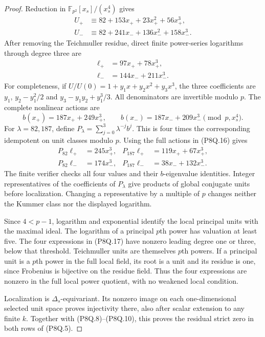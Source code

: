 \begin{proof}
Reduction in $\mathbb F_{p^2}[x_s]/(x_s^4)$ gives
\[
 \begin{aligned}
 U_+&\equiv82+153x_++23x_+^2+56x_+^3,\\
 U_-&\equiv82+241x_-+136x_-^2+158x_-^3 .
 \end{aligned}
 \tag{P8Q.14}
\]
After removing the Teichmuller residue, direct finite
power-series logarithms through degree three are
\[
 \begin{aligned}
 \ell_+&=97x_++78x_+^3,\\
 \ell_-&=144x_-+211x_-^3 .
 \end{aligned}
 \tag{P8Q.15}
\]
For completeness, if $U/U(0)=1+y_1x+y_2x^2+y_3x^3$,
the three coefficients are
$y_1$, $y_2-y_1^2/2$ and
$y_3-y_1y_2+y_1^3/3$.
All denominators are invertible modulo $p$.
The complete nonlinear actions are
\[
       b(x_+)=187x_++249x_+^3,\qquad
       b(x_-)=187x_-+209x_-^3
                         \pmod{p,x_s^4}.
 \tag{P8Q.16}
\]
For $\lambda=82,187$, define
$P_\lambda=\sum_{j=0}^3\lambda^{-j}b^j$.
This is four times the corresponding idempotent on unit
classes modulo $p$.
Using the full actions in (P8Q.16) gives
\[
 \begin{aligned}
 P_{82}\ell_+&=245x_+^3,&
 P_{187}\ell_+&=119x_++67x_+^3,\\
 P_{82}\ell_-&=174x_-^3,&
 P_{187}\ell_-&=38x_-+132x_-^3 .
 \end{aligned}
 \tag{P8Q.17}
\]
The finite verifier checks all four values and their
$b$-eigenvalue identities.
Integer representatives of the coefficients of $P_\lambda$
give products of global conjugate units before localization.
Changing a representative by a multiple of $p$ changes
neither the Kummer class nor the displayed logarithm.

Since $4<p-1$, logarithm and exponential identify the local
principal units with the maximal ideal.
The logarithm of a principal $p$th power has valuation at
least five.
The four expressions in (P8Q.17) have nonzero leading
degree one or three, below that threshold.
Teichmuller units are themselves $p$th powers.
If a principal unit is a $p$th power in the full local
field, its root is a unit and its residue is one, since
Frobenius is bijective on the residue field.
Thus the four expressions are nonzero in the full local
power quotient, with no weakened local condition.

Localization is $\Delta_s$-equivariant.
Its nonzero image on each one-dimensional selected unit
space proves injectivity there, also after scalar extension
to any finite $k$.
Together with (P8Q.8)--(P8Q.10), this proves the residual
strict zero in both rows of (P8Q.5).


\end{proof}
